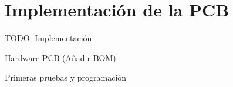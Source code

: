\chapter{Implementación de la PCB\label{sec:Implementacion_PCB}}

TODO: Implementación

Hardware
	PCB (Añadir BOM)
	
	Primeras pruebas y programación
	

	
	